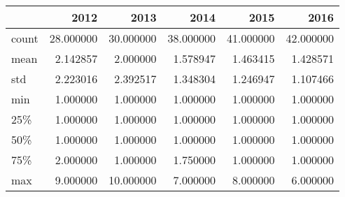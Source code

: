 \begin{tabular}{lrrrrr}
\toprule
{} &       2012 &       2013 &       2014 &       2015 &       2016 \\
\midrule
count &  28.000000 &  30.000000 &  38.000000 &  41.000000 &  42.000000 \\
mean  &   2.142857 &   2.000000 &   1.578947 &   1.463415 &   1.428571 \\
std   &   2.223016 &   2.392517 &   1.348304 &   1.246947 &   1.107466 \\
min   &   1.000000 &   1.000000 &   1.000000 &   1.000000 &   1.000000 \\
25\%   &   1.000000 &   1.000000 &   1.000000 &   1.000000 &   1.000000 \\
50\%   &   1.000000 &   1.000000 &   1.000000 &   1.000000 &   1.000000 \\
75\%   &   2.000000 &   1.000000 &   1.750000 &   1.000000 &   1.000000 \\
max   &   9.000000 &  10.000000 &   7.000000 &   8.000000 &   6.000000 \\
\bottomrule
\end{tabular}
